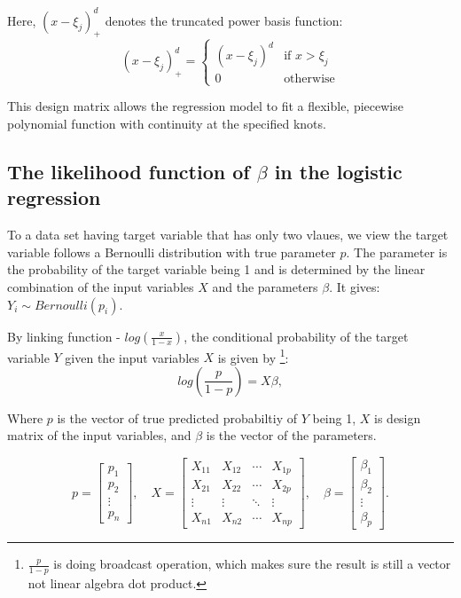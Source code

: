 Here, $(x - \xi_j)_+^d$ denotes the truncated power basis function:
\[
(x - \xi_j)_+^d = 
\begin{cases}
(x - \xi_j)^d & \text{if } x > \xi_j \\
0 & \text{otherwise}
\end{cases}
\]

This design matrix allows the regression model to fit a flexible, 
piecewise polynomial function with continuity at the specified knots.

\subsection{The likelihood function of $\beta$ in the logistic regression}

To a data set having target variable that has only two vlaues, we view the target variable follows a Bernoulli distribution with
true parameter $p$. The parameter is the probability of the target variable being 1 and is determined by 
the linear combination of the input variables $X$ and the parameters $\beta$. It gives: \(Y_i \sim Bernoulli(p_i)\).

By linking function - \(log(\frac{x}{1-x})\), the conditional probability of the target variable $Y$ given the input variables $X$ is given by
\footnote{$\frac{p}{1-p}$ is doing broadcast operation, which makes sure the result is still a vector 
not linear algebra dot product.}:
\[
log(\frac{p}{1-p}) = X \beta, 
\]

Where \(p\) is the vector of true predicted probabiltiy of \(Y\) being 1, \(X\) is design matrix of the input variables, 
and \(\beta\) is the vector of the parameters.


\[
p = \begin{bmatrix} p_1 \\ p_2 \\ \vdots \\ p_n \end{bmatrix}, \quad
X = \begin{bmatrix} X_{11} & X_{12} & \cdots & X_{1p} \\ X_{21} & X_{22} & \cdots & X_{2p} \\ \vdots & \vdots & \ddots & \vdots \\ X_{n1} & X_{n2} & \cdots & X_{np} \end{bmatrix}, \quad
\beta = \begin{bmatrix} \beta_1 \\ \beta_2 \\ \vdots \\ \beta_p \end{bmatrix}.
\]

